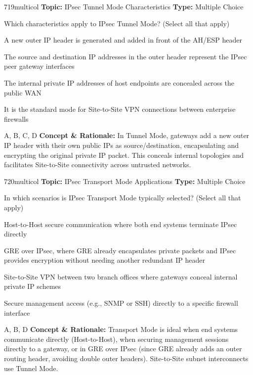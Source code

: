 \begin{qcard}{719}{multicol}
\textcolor{darkslate!75}{\small\textbf{Topic:} IPsec Tunnel Mode Characteristics \hfill \textbf{Type:} Multiple Choice}\vspace{0.4em}\par
Which characteristics apply to IPsec Tunnel Mode? (Select all that apply)
\begin{qoptions}
\item A new outer IP header is generated and added in front of the AH/ESP header
\item The source and destination IP addresses in the outer header represent the IPsec peer gateway interfaces
\item The internal private IP addresses of host endpoints are concealed across the public WAN
\item It is the standard mode for Site-to-Site VPN connections between enterprise firewalls
\end{qoptions}
\end{qcard}
\nopagebreak
\begin{explainbox}{A, B, C, D}
\textbf{Concept \& Rationale:} In Tunnel Mode, gateways add a new outer IP header with their own public IPs as source/destination, encapsulating and encrypting the original private IP packet. This conceals internal topologies and facilitates Site-to-Site connectivity across untrusted networks.
\end{explainbox}

\begin{qcard}{720}{multicol}
\textcolor{darkslate!75}{\small\textbf{Topic:} IPsec Transport Mode Applications \hfill \textbf{Type:} Multiple Choice}\vspace{0.4em}\par
In which scenarios is IPsec Transport Mode typically selected? (Select all that apply)
\begin{qoptions}
\item Host-to-Host secure communication where both end systems terminate IPsec directly
\item GRE over IPsec, where GRE already encapsulates private packets and IPsec provides encryption without needing another redundant IP header
\item Site-to-Site VPN between two branch offices where gateways conceal internal private IP schemes
\item Secure management access (e.g., SNMP or SSH) directly to a specific firewall interface
\end{qoptions}
\end{qcard}
\nopagebreak
\begin{explainbox}{A, B, D}
\textbf{Concept \& Rationale:} Transport Mode is ideal when end systems communicate directly (Host-to-Host), when securing management sessions directly to a gateway, or in GRE over IPsec (since GRE already adds an outer routing header, avoiding double outer headers). Site-to-Site subnet interconnects use Tunnel Mode.
\end{explainbox}

